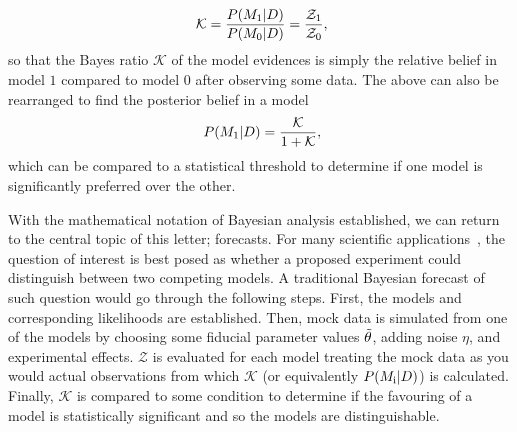 \documentclass[twocolumn,english,aps,prd,amsmath,amssymb,reprint,floatfix,nofootinbib,showkeys]{revtex4-2}
\newcommand{\modelz}{M_{\rm 0}}
\newcommand{\modelo}{M_{\rm 1}}
\newcommand{\Z}{\mathcal{Z}}
\newcommand{\br}{\mathcal{K}}
\newif\ifhighlightchanges
\newcommand{\change}[1]{{\ifhighlightchanges\color{red} #1\else #1\fi}}
\begin{document}
\begin{equation}~\label{eqn:bayes_ratio}
    \br = \frac{P(\modelo| D)}{P(\modelz | D)} = \frac{\Z_{\rm 1} }{\Z_{\rm 0}},
\end{equation}
so that the Bayes ratio $\br$ of the model evidences is simply the relative belief in model $1$ compared to model $0$ after observing some data. 
The above can also be rearranged to find the posterior belief in a model 
\begin{equation}~\label{eqn:model_posterior_absolute}
    P(\modelo| D) = \frac{\br}{1 + \br},
\end{equation}
which can be compared to a statistical threshold to determine if one model is significantly preferred over the other. 




With the mathematical notation of Bayesian analysis established, we can return to the central topic of this letter; forecasts.
\change{For many scientific applications~\citep{Mukherjee_2006, Trotta_2007}, the question of interest is best posed as} whether a proposed experiment could distinguish between two \change{competing} models.
\change{A traditional Bayesian forecast of such question would go} through the following steps. 
First, the models and corresponding likelihoods are established.
Then, mock data is simulated from one of the models by choosing some fiducial parameter values $\Tilde{\theta}$, adding noise $\eta$, and experimental effects.
$\Z$ is evaluated for each model treating the mock data as you would actual observations from which $\br$ (or equivalently $P(M_{\rm i}| D)$) is calculated. 
Finally, $\br$ is compared to some condition to determine if the favouring of a model is statistically significant and so the models are distinguishable.
\end{document}
